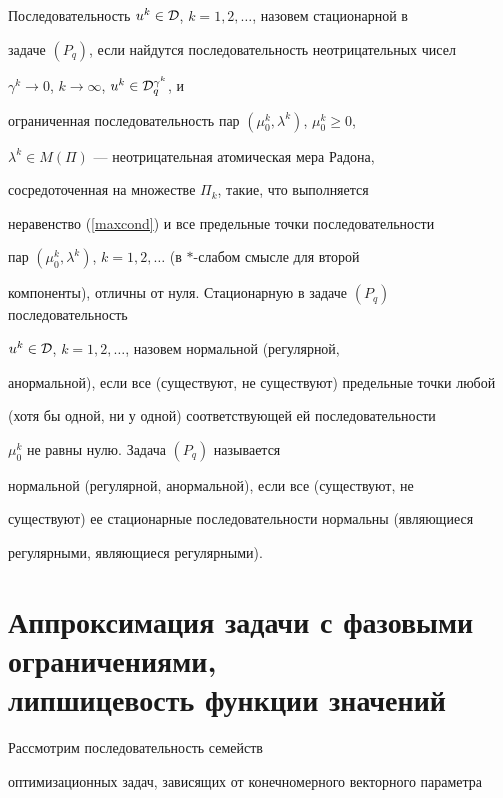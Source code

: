 \begin{defns}


Последовательность $u^k\in{\cal D}$, $k=1,2,\dotsc$, назовем стационарной в


задаче $(P_q)$, если найдутся последовательность неотрицательных чисел


$\gamma^k\to0$, $k\to\infty$, $u^k\in {\cal D}^{\gamma^k}_q$, и


ограниченная последовательность пар $(\mu^k_0,\lambda^k)$, $\mu_0^k\geq0$,


$\lambda^k\in M(\Pi)$ --- неотрицательная атомическая мера Радона,


сосредоточенная на множестве $\Pi_k$, такие, что выполняется


неравенство (\ref{maxcond}) и все предельные точки последовательности


пар $(\mu^k_0,\lambda^k)$, $k=1,2,\dotsc$ (в $*$-слабом смысле для второй


компоненты), отличны от нуля. Стационарную в задаче $(P_q)$ последовательность


$u^k\in{\cal D}$, $k=1,2,\dotsc$, назовем нормальной (регулярной,


анормальной), если все (существуют, не существуют) предельные точки любой


(хотя бы одной, ни у одной) соответствующей ей последовательности


$\mu^k_0$ не равны нулю. Задача $(P_q)$ называется


нормальной (регулярной, анормальной), если все (существуют, не


существуют) ее стационарные последовательности нормальны (являющиеся


регулярными, являющиеся регулярными).


\end{defns}








\section{Аппроксимация задачи с фазовыми ограничениями,\protect\\


липшицевость функции значений}





Рассмотрим последовательность семейств


оптимизационных задач, зависящих от конечномерного векторного параметра


